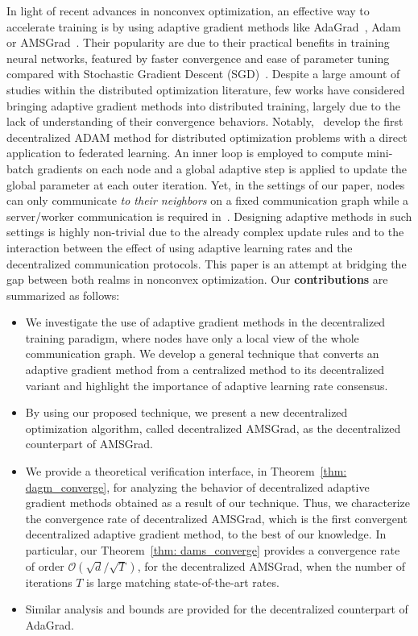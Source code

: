\documentclass[anon,12pt]{colt2021} %
\begin{document}
In light of recent advances in nonconvex optimization, an effective way to accelerate training is by using adaptive gradient methods like AdaGrad~\citep{duchi2011adaptive}, Adam~\cite{kingma2014adam} or AMSGrad~\citep{reddi2019convergence}. 
Their popularity are due to their practical benefits in training neural networks, featured by faster convergence and ease of parameter tuning compared with Stochastic Gradient Descent (SGD)~\citep{robbins1951stochastic}.
Despite a large amount of studies within the distributed optimization literature, few works have considered bringing adaptive gradient methods into distributed training, largely due to the lack of understanding of their convergence behaviors. 
Notably,~\cite{reddi2020adaptive} develop the first decentralized ADAM method for distributed optimization problems with a direct application to federated learning.
An inner loop is employed to compute mini-batch gradients on each node and a global adaptive step is applied to update the global parameter at each outer iteration.
Yet, in the settings of our paper, nodes can only communicate \emph{to their neighbors} on a fixed communication graph while a server/worker communication is required in~\cite{reddi2020adaptive}.
Designing adaptive methods in such settings is highly non-trivial due to the already complex update rules and to the interaction between the effect of using adaptive learning rates and the decentralized communication protocols.
This paper is an attempt at bridging the gap between both realms in nonconvex optimization. 
Our \textbf{contributions} are summarized as follows:\vspace{-0.1in}
\begin{itemize}
\item We investigate the use of  adaptive gradient methods in the decentralized training paradigm, where nodes have only a local view of the whole communication graph. We develop a general technique that converts an adaptive gradient method from a centralized method to its decentralized variant and highlight the importance of adaptive learning rate consensus. \vspace{-0.1in}
\item By using our proposed technique, we present a new decentralized optimization algorithm, called decentralized AMSGrad, as the decentralized counterpart of AMSGrad.\vspace{-0.1in}
\item We provide a theoretical verification interface, in Theorem~\ref{thm: dagm_converge}, for analyzing the behavior of decentralized adaptive gradient methods obtained as a result of our technique.
Thus, we characterize the convergence rate of decentralized AMSGrad, which is the first convergent decentralized adaptive gradient method, to the best of our knowledge.
In particular, our Theorem~\ref{thm: dams_converge} provides a convergence rate of order $\mathcal{O}(\sqrt{d}/\sqrt{T})$, for the decentralized AMSGrad, when the number of iterations $T$ is large matching state-of-the-art rates.\vspace{-0.1in}
\item Similar analysis and bounds are provided for the decentralized counterpart of AdaGrad.
\end{itemize}
\end{document}
